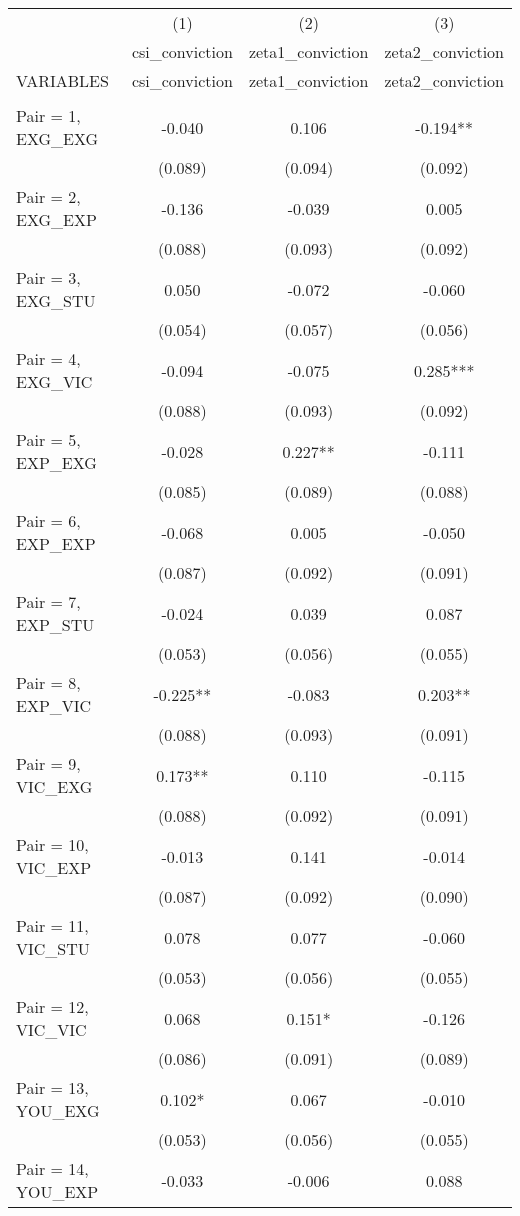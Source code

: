 \documentclass[]{article}
\begin{document}
\begin{tabular}{lccc} \hline
 & (1) & (2) & (3) \\
 & csi\_conviction & zeta1\_conviction & zeta2\_conviction \\
VARIABLES & csi\_conviction & zeta1\_conviction & zeta2\_conviction \\ \hline
 &  &  &  \\
Pair = 1, EXG\_EXG & -0.040 & 0.106 & -0.194** \\
 & (0.089) & (0.094) & (0.092) \\
Pair = 2, EXG\_EXP & -0.136 & -0.039 & 0.005 \\
 & (0.088) & (0.093) & (0.092) \\
Pair = 3, EXG\_STU & 0.050 & -0.072 & -0.060 \\
 & (0.054) & (0.057) & (0.056) \\
Pair = 4, EXG\_VIC & -0.094 & -0.075 & 0.285*** \\
 & (0.088) & (0.093) & (0.092) \\
Pair = 5, EXP\_EXG & -0.028 & 0.227** & -0.111 \\
 & (0.085) & (0.089) & (0.088) \\
Pair = 6, EXP\_EXP & -0.068 & 0.005 & -0.050 \\
 & (0.087) & (0.092) & (0.091) \\
Pair = 7, EXP\_STU & -0.024 & 0.039 & 0.087 \\
 & (0.053) & (0.056) & (0.055) \\
Pair = 8, EXP\_VIC & -0.225** & -0.083 & 0.203** \\
 & (0.088) & (0.093) & (0.091) \\
Pair = 9, VIC\_EXG & 0.173** & 0.110 & -0.115 \\
 & (0.088) & (0.092) & (0.091) \\
Pair = 10, VIC\_EXP & -0.013 & 0.141 & -0.014 \\
 & (0.087) & (0.092) & (0.090) \\
Pair = 11, VIC\_STU & 0.078 & 0.077 & -0.060 \\
 & (0.053) & (0.056) & (0.055) \\
Pair = 12, VIC\_VIC & 0.068 & 0.151* & -0.126 \\
 & (0.086) & (0.091) & (0.089) \\
Pair = 13, YOU\_EXG & 0.102* & 0.067 & -0.010 \\
 & (0.053) & (0.056) & (0.055) \\
Pair = 14, YOU\_EXP & -0.033 & -0.006 & 0.088 \\

\end{tabular}
\end{document}
